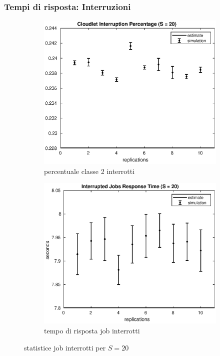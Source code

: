 \subsubsection{Tempi di risposta: Interruzioni}
%
\begin{figure}[!h]
\centering
%
\begin{subfigure}[t]{0.49\textwidth}
\includegraphics[width=\textwidth]{figures/simul/20_500K_intperc}
\caption{percentuale classe 2 interrotti}
\label{20_intperc}
\end{subfigure}
%
\begin{subfigure}[t]{0.49\textwidth}
\includegraphics[width=\textwidth]{figures/simul/20_500K_sintr}
\caption{tempo di risposta job interrotti}
\label{20_s2cloud}
\end{subfigure}
%
\caption{statistice job interrotti per $S=20$}
\end{figure}

